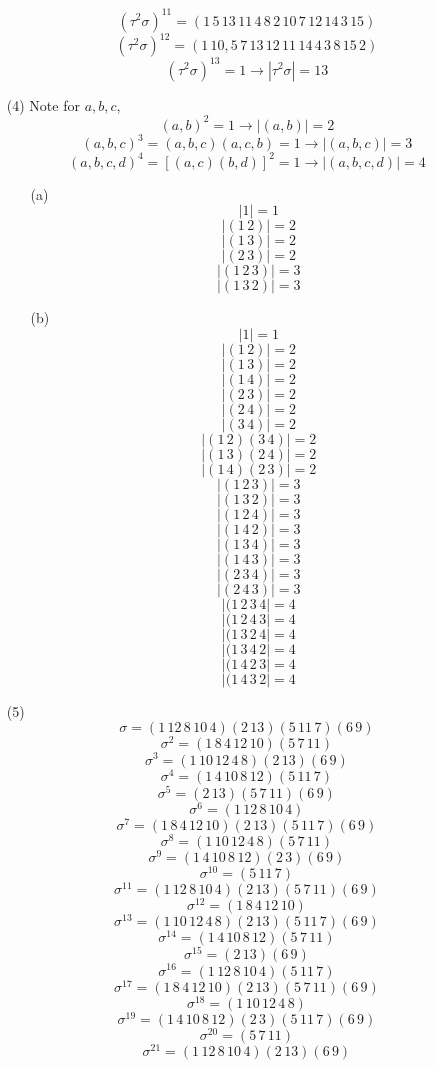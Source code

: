 \documentclass[12pt]{article}
\begin{document}
\begin{itemize}
$$(\tau^2\sigma)^{11} = (1 \, 5 \, 13 \, 11 \, 4 \, 8 \, 2 \, 10 \, 7 \, 12 \, 14 \, 3 \, 15)$$
$$(\tau^2\sigma)^{12} = (1 \, 10 , 5 \, 7 \, 13 \, 12 \, 11 \, 14 \, 4 \, 3 \, 8 \, 15 \, 2)$$
$$(\tau^2\sigma)^{13} = 1 \rightarrow |\tau^2\sigma| = 13$$
\item[(4)]
Note for $a, b, c$,
$$(a, b)^2 = 1 \rightarrow |(a, b)| = 2$$
$$(a, b, c)^3 = (a, b, c)(a, c, b) = 1 \rightarrow |(a, b, c)| = 3$$
$$(a, b, c, d)^4 = [(a, c)(b, d)]^2 = 1 \rightarrow |(a, b, c, d)| = 4$$
\begin{itemize}
\item[(a)]
$$|1| = 1$$
$$|(1 \, 2)| = 2$$
$$|(1 \, 3)| = 2$$
$$|(2 \, 3)| = 2$$
$$|(1 \, 2 \, 3)| = 3$$
$$|(1 \, 3 \, 2)| = 3$$
\item[(b)]
$$|1| = 1$$
$$|(1 \, 2)| = 2$$
$$|(1 \, 3)| = 2$$
$$|(1 \, 4)| = 2$$
$$|(2 \, 3)| = 2$$
$$|(2 \, 4)| = 2$$
$$|(3 \, 4)| = 2$$
$$|(1 \, 2)(3 \, 4)| = 2$$
$$|(1 \, 3)(2 \, 4)| = 2$$
$$|(1 \, 4)(2 \, 3)| = 2$$
$$|(1 \, 2 \, 3)| = 3$$
$$|(1 \, 3 \, 2)| = 3$$
$$|(1 \, 2 \, 4)| = 3$$
$$|(1 \, 4 \, 2)| = 3$$
$$|(1 \, 3 \, 4)| = 3$$
$$|(1 \, 4 \, 3)| = 3$$
$$|(2 \, 3 \, 4)| = 3$$
$$|(2 \, 4 \, 3)| = 3$$
$$|(1 \, 2 \, 3 \, 4| = 4$$
$$|(1 \, 2 \, 4 \, 3| = 4$$
$$|(1 \, 3 \, 2 \, 4| = 4$$
$$|(1 \, 3 \, 4 \, 2| = 4$$
$$|(1 \, 4 \, 2 \, 3| = 4$$
$$|(1 \, 4 \, 3 \, 2| = 4$$
\end{itemize}
\item[(5)]
$$\sigma = (1 \, 12 \, 8 \, 10 \, 4)(2 \, 13)(5 \, 11 \, 7)(6 \, 9)$$
$$\sigma^2 = (1 \, 8 \, 4 \, 12 \, 10)(5 \, 7 \, 11)$$
$$\sigma^3 = (1 \, 10 \, 12 \, 4 \, 8)(2 \, 13)(6 \, 9)$$
$$\sigma^4 = (1 \, 4 \, 10 \, 8 \, 12)(5 \, 11 \, 7)$$
$$\sigma^5 = (2 \, 13)(5 \, 7 \, 11)(6 \, 9)$$
$$\sigma^6 = (1 \, 12 \, 8 \, 10 \, 4)$$
$$\sigma^7 = (1 \, 8 \, 4 \, 12 \, 10)(2 \, 13)(5 \, 11 \, 7)(6 \, 9)$$
$$\sigma^8 = (1 \, 10 \, 12 \, 4 \, 8)(5 \, 7 \, 11)$$
$$\sigma^9 = (1 \, 4 \, 10 \, 8 \, 12)(2 \, 3)(6 \, 9)$$
$$\sigma^{10} = (5 \, 11 \, 7)$$
$$\sigma^{11} = (1 \, 12 \, 8 \, 10 \, 4)(2 \, 13)(5 \, 7 \, 11)(6 \, 9)$$
$$\sigma^{12} = (1 \, 8 \, 4 \, 12 \, 10)$$
$$\sigma^{13} = (1 \, 10 \, 12 \, 4 \, 8)(2 \, 13)(5 \, 11 \, 7)(6 \, 9)$$
$$\sigma^{14} = (1 \, 4 \, 10 \, 8 \, 12)(5 \, 7 \, 11)$$
$$\sigma^{15} = (2 \, 13)(6 \, 9)$$
$$\sigma^{16} = (1 \, 12 \, 8 \, 10 \, 4)(5 \, 11 \, 7)$$
$$\sigma^{17} = (1 \, 8 \, 4 \, 12 \, 10)(2 \, 13)(5 \, 7 \, 11)(6 \, 9)$$
$$\sigma^{18} = (1 \, 10 \, 12 \, 4 \, 8)$$
$$\sigma^{19} = (1 \, 4 \, 10 \, 8 \, 12)(2 \, 3)(5 \, 11 \, 7)(6 \, 9)$$
$$\sigma^{20} = (5 \, 7 \, 11)$$
$$\sigma^{21} = (1 \, 12 \, 8 \, 10 \, 4)(2 \, 13)(6 \, 9)$$

\end{itemize}
\end{document}
